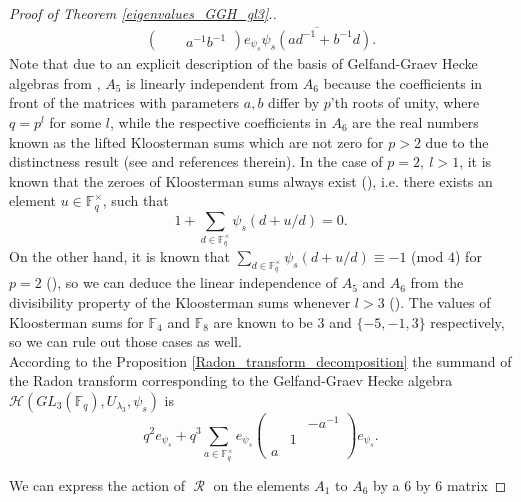 \documentclass[12pt,reqno]{amsart}
\theoremstyle{definition}
\theoremstyle{remark}
\numberwithin{equation}{section}
\newcommand{\GL}[1]{GL_{#1}(\mathbb{F}_q)}
\DeclareMathOperator{\R}{\mathcal{R}}
\def\IM#1{\textcolor[rgb]{0.00,0.00,0.75}{[I: #1]}}
\begin{document}
\begin{proof}[Proof of Theorem \ref{eigenvalues_GGH_gl3}.]
\begin{align*}
\begin{pmatrix}
            & & a^{-1}b^{-1}
        \end{pmatrix} e_{\psi_s} \overline{\psi_s(ad^{-1}+b^{-1}d)}.
    \end{align*}
    Note that due to an explicit description of the basis of Gelfand-Graev Hecke algebras from \cite[Section 4.2]{T}, $A_5$ is linearly independent from $A_6$ because the coefficients in front of the matrices with parameters $a,b$ differ by $p$'th roots of unity, where $q=p^l$ for some $l$, while the respective coefficients in $A_6$ are the real numbers known as the lifted Kloosterman sums which are not zero for $p>2$ due to the distinctness result (see \cite{BB} and references therein). In the case of $p=2,\ l>1$, it is known that the zeroes of Kloosterman sums always exist (\cite{LM09}), i.e. there exists an element $u\in \mathbb{F}_q^{\times}$, such that
    \[
    1+\sum_{d\in \mathbb{F}_q^{\times}}\psi_s(d+u/d)=0.
    \]    
    On the other hand, it is known that $\sum_{d\in \mathbb{F}_q^{\times}}\psi_s(d+u/d) \equiv -1$ (mod $4$) for $p=2$ (\cite{LM09}), so we can deduce the linear independence of $A_5$ and $A_6$ from the divisibility property of the Kloosterman sums whenever $l>3$ (\cite[Theorem 3.6]{LM11}). The values of Kloosterman sums for $\mathbb{F}_4$ and $\mathbb{F}_8$ are known to be $3$ and $\{-5,-1,3\}$ respectively, so we can rule out those cases as well.\\

    According to the Proposition \ref{Radon_transform_decomposition} the summand of the Radon transform corresponding to the Gelfand-Graev Hecke algebra $\mathcal{H}(\GL{3},U_{\lambda_3},\psi_s)$ is
    \[
    q^2e_{\psi_s}+q^3\sum_{a \in \mathbb{F}_q^\times} e_{\psi_s} \begin{pmatrix}
            & & -a^{-1}\\
            & 1 &\\
            a & &
        \end{pmatrix} e_{\psi_s}.
    \]
    
    We can express the action of $\R$ on the elements $A_1$ to $A_6$ by a 6 by 6 matrix
    

\end{proof}
\end{document}
